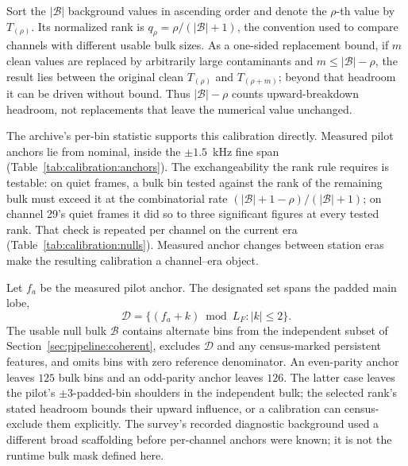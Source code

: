 Sort the $|\mathcal{B}|$ background values in ascending order and denote the $\rho$-th value by $T_{(\rho)}$. Its normalized rank is $q_\rho=\rho/(|\mathcal{B}|+1)$, the convention used to compare channels with different usable bulk sizes. As a one-sided replacement bound, if $m$ clean values are replaced by arbitrarily large contaminants and $m \le |\mathcal{B}|-\rho$, the result lies between the original clean $T_{(\rho)}$ and $T_{(\rho+m)}$; beyond that headroom it can be driven without bound. Thus $|\mathcal{B}|-\rho$ counts upward-breakdown headroom, not replacements that leave the numerical value unchanged.

The archive's per-bin statistic supports this calibration directly. Measured pilot anchors lie  from nominal, inside the $\pm1.5$~kHz fine span (Table~\ref{tab:calibration:anchors}). The exchangeability the rank rule requires is testable: on quiet frames, a bulk bin tested against the rank of the remaining bulk must exceed it at the combinatorial rate $(|\mathcal{B}|+1-\rho)/(|\mathcal{B}|+1)$; on channel 29's quiet frames it did so to three significant figures at every tested rank. That check is repeated per channel on the current era (Table~\ref{tab:calibration:nulls}). Measured anchor changes between station eras make the resulting calibration a channel--era object.

Let $f_a$ be the measured pilot anchor. The designated set spans the padded main lobe,
\begin{equation}
\mathcal{D} = \{ (f_a + k) \bmod L_F : |k| \le 2 \}.
\end{equation}
The usable null bulk $\mathcal{B}$ contains alternate bins from the independent subset of Section~\ref{sec:pipeline:coherent}, excludes $\mathcal{D}$ and any census-marked persistent features, and omits bins with zero reference denominator. An even-parity anchor leaves $125$ bulk bins and an odd-parity anchor leaves $126$. The latter case leaves the pilot's $\pm3$-padded-bin shoulders in the independent bulk; the selected rank's stated headroom bounds their upward influence, or a calibration can census-exclude them explicitly. The survey's recorded diagnostic background used a different broad scaffolding before per-channel anchors were known; it is not the runtime bulk mask defined here.

